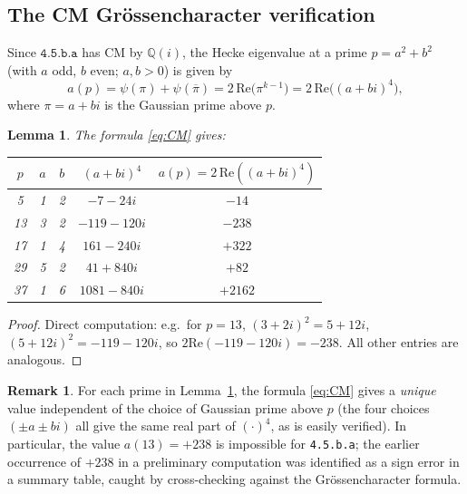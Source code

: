 \documentclass[12pt]{amsart}
\newtheorem{lemma}[theorem]{Lemma}
\theoremstyle{definition}
\newtheorem{remark}[theorem]{Remark}
\newcommand{\Q}{\mathbb{Q}}
\newcommand{\lmfdb}[1]{\texttt{#1}}  %
\renewcommand{\Re}{\mathrm{Re}}
\begin{document}
\subsection{The CM Gr\"ossencharacter verification}

Since $\lmfdb{4.5.b.a}$ has CM by $\Q(i)$, the Hecke eigenvalue at a
prime $p = a^2+b^2$ (with $a$ odd, $b$ even; $a,b > 0$) is given by
\begin{equation}\label{eq:CM}
  a(p) = \psi(\pi) + \psi(\overline{\pi})
        = 2\,\Re\bigl(\pi^{k-1}\bigr)
        = 2\,\Re\bigl((a+bi)^4\bigr),
\end{equation}
where $\pi = a + bi$ is the Gaussian prime above $p$.

\begin{lemma}\label{lem:CM-values}
  The formula \eqref{eq:CM} gives:
  \begin{center}
  \begin{tabular}{@{}ccccc@{}}
    \toprule
    $p$ & $a$ & $b$ & $(a+bi)^4$ & $a(p) = 2\,\Re((a+bi)^4)$\\
    \midrule
    5  & 1 & 2 & $-7 - 24i$   & $-14$  \\
    13 & 3 & 2 & $-119-120i$  & $-238$ \\
    17 & 1 & 4 & $161 - 240i$ & $+322$ \\
    29 & 5 & 2 & $41 + 840i$  & $+82$  \\
    37 & 1 & 6 & $1081-840i$  & $+2162$ \\
    \bottomrule
  \end{tabular}
  \end{center}
\end{lemma}

\begin{proof}
  Direct computation: e.g.\ for $p=13$,
  $(3+2i)^2 = 5+12i$, $(5+12i)^2 = -119-120i$, so
  $2\Re(-119-120i) = -238$.
  All other entries are analogous.
\end{proof}

\begin{remark}
  For each prime in Lemma~\ref{lem:CM-values}, the formula \eqref{eq:CM}
  gives a \emph{unique} value independent of the choice of Gaussian prime
  above $p$ (the four choices $({\pm a \pm bi})$ all give the same
  real part of $(\cdot)^4$, as is easily verified).  In particular,
  the value $a(13)=+238$ is impossible for \lmfdb{4.5.b.a}; the
  earlier occurrence of $+238$ in a preliminary computation was
  identified as a sign error in a summary table, caught by
  cross-checking against the Gr\"ossencharacter formula.
\end{remark}
\end{document}
